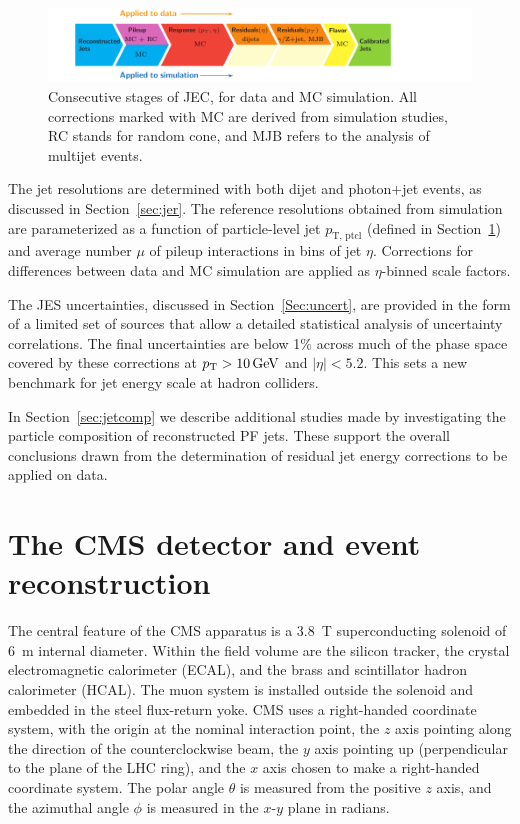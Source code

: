 \documentclass[11pt,twoside,a4paper,cmspaper,final,collab]{cms-tdr}
\begin{document}
\begin{figure}[htbp!]
\begin{center}
\includegraphics[width=1.15\textwidth]{Figure_002.pdf}
\caption{Consecutive stages of JEC, for data and MC simulation. All corrections marked with MC are derived
from simulation studies, RC stands for random cone, and MJB refers to the analysis of multijet events.} \label{fig:jecfactorized}
\end{center}
\end{figure}

The jet \pt resolutions are determined with both dijet and photon+jet events, as discussed in Section~\ref{sec:jer}. The reference resolutions obtained from simulation are parameterized as a function of particle-level jet $p_\text{T, ptcl}$ (defined in Section~\ref{sec:cms}) and average number $\mu$ of pileup interactions in bins of jet $\eta$.
Corrections for differences between data and MC simulation are applied as $\eta$-binned scale factors.

The JES uncertainties, discussed in Section~\ref{Sec:uncert}, are provided in the form of a limited set of sources that allow a detailed statistical analysis of uncertainty correlations.
The final uncertainties are below 1\% across much of the phase space covered by these corrections at $p_{\mathrm{T}}>10\,\text{Ge\hspace{-.08em}V}$ and $ \vert \eta \vert <5.2$. This sets a new benchmark for jet energy scale at hadron colliders.

In Section~\ref{sec:jetcomp} we describe additional studies made by investigating the particle composition of reconstructed PF jets. These support the overall conclusions drawn from the determination of residual jet energy corrections to be applied on data.

\section{The CMS detector and event reconstruction}
\label{sec:cms}

The central feature of the CMS apparatus is a 3.8~T superconducting
solenoid of 6~m internal diameter.  Within the field volume are the
silicon tracker, the crystal electromagnetic calorimeter (ECAL), and
the brass and scintillator hadron calorimeter (HCAL).  The muon system is
installed outside the solenoid and embedded in the steel flux-return yoke.
CMS uses a right-handed coordinate system, with the origin at the nominal interaction point, the $z$ axis pointing along the direction of the counterclockwise beam,
the $y$ axis pointing up (perpendicular to the plane of the LHC ring), and the $x$ axis chosen to make a right-handed coordinate system.
The polar angle $\theta$ is measured from the positive $z$ axis, and the azimuthal angle $\phi$ is measured in the $x$-$y$ plane in radians.
\end{document}
